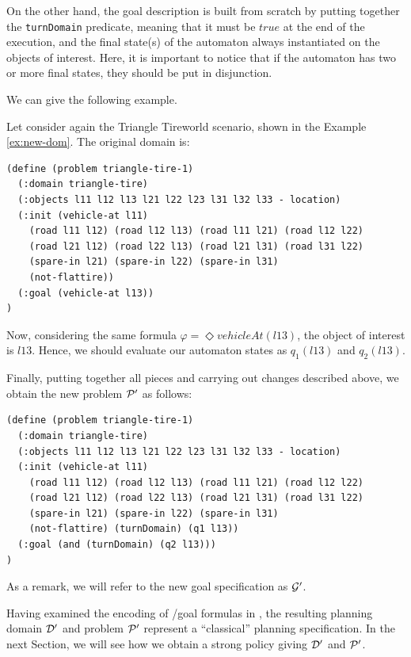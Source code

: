 On the other hand, the goal description is built from scratch by putting together the \texttt{turnDomain} predicate, meaning that it must be $true$ at the end of the execution, and the final state(s) of the automaton always instantiated on the objects of interest. Here, it is important to notice that if the automaton has two or more final states, they should be put in disjunction.

We can give the following example.

\begin{example}\label{ex:new-prob}
Let consider again the Triangle Tireworld scenario, shown in the Example \ref{ex:new-dom}. The original \PDDL domain is:
\begin{lstlisting}[language=PDDL, escapechar=£]
(define (problem triangle-tire-1)
  (:domain triangle-tire)
  (:objects l11 l12 l13 l21 l22 l23 l31 l32 l33 - location)
  (:init (vehicle-at l11)
    (road l11 l12) (road l12 l13) (road l11 l21) (road l12 l22)
    (road l21 l12) (road l22 l13) (road l21 l31) (road l31 l22)
    (spare-in l21) (spare-in l22) (spare-in l31)
    (not-flattire))
  (:goal (vehicle-at l13))
)
\end{lstlisting}
Now, considering the same \LTLf formula $\varphi = \Diamond vehicleAt(l13)$, the object of interest is $l13$. Hence, we should evaluate our automaton states as $q_1(l13)$ and $q_2(l13)$.

Finally, putting together all pieces and carrying out changes described above, we obtain the new problem $\P'$ as follows:

\begin{lstlisting}[language=PDDL, escapechar=£]
(define (problem triangle-tire-1)
  (:domain triangle-tire)
  (:objects l11 l12 l13 l21 l22 l23 l31 l32 l33 - location)
  (:init (vehicle-at l11)
    (road l11 l12) (road l12 l13) (road l11 l21) (road l12 l22)
    (road l21 l12) (road l22 l13) (road l21 l31) (road l31 l22)
    (spare-in l21) (spare-in l22) (spare-in l31)
    (not-flattire) (turnDomain) (q1 l13))
  (:goal (and (turnDomain) (q2 l13)))
)
\end{lstlisting}
As a remark, we will refer to the new goal specification as $\G'$.
\end{example}

Having examined the encoding of \LTLf/\PLTL goal formulas in \PDDL, the resulting planning domain $\D'$ and problem $\P'$ represent a ``classical'' planning specification. In the next Section, we will see how we obtain a strong policy giving $\D'$ and $\P'$.

